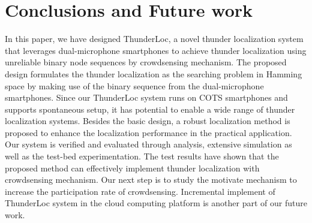 
\section{Conclusions and Future work}

In this paper, we have designed ThunderLoc, a novel thunder localization system that leverages dual-microphone smartphones to achieve thunder localization using unreliable binary node sequences by crowdsensing mechanism.
The proposed design formulates the thunder localization as the searching problem in Hamming space by making use of the binary sequence from the dual-microphone smartphones.
Since our ThunderLoc system runs on COTS smartphones and supports spontaneous setup, it has potential to enable a wide range of thunder localization systems.
Besides the basic design, a robust localization method is proposed to enhance the localization performance in the practical application.
Our system is verified and evaluated through analysis, extensive simulation as well as the test-bed experimentation.
The test results have shown that the proposed method can effectively implement thunder localization with crowdsensing mechanism.
Our next step is to study the motivate mechanism to increase the participation rate of crowdsensing. 
Incremental implement of ThunderLoc system in the cloud computing platform is another part of our future work.


